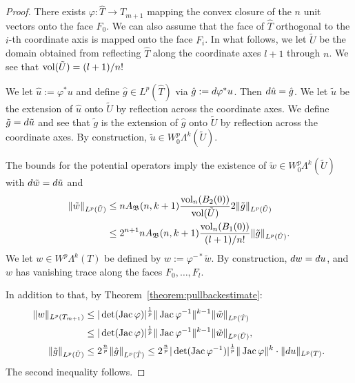 \documentclass[10pt,letterpaper]{article}
\begin{document}
\begin{proof}
    There exists $\varphi : \hat T \rightarrow T_{m+1}$ mapping the convex closure of the $n$ unit vectors onto the face $F_0$.
    We can also assume that the face of $\hat T$
    orthogonal to the $i$-th coordinate axis is mapped 
    onto the face $F_i$. 
    In what follows, we let $\tilde U$ be the domain obtained from reflecting $\hat T$ along the coordinate axes $l+1$ through $n$. 
    We see that $\operatorname{vol}(\tilde U) = (l+1)/n!$
    
    
    We let $\hat u := \varphi^{\ast} u$ and define $\hat g \in L^{p}(\hat T)$ via $\hat g := d \varphi^{\ast} u$. 
    Then $d \hat u = \hat g$. 
    We let $\tilde u$ be the extension of $\hat u$ onto $\tilde U$ by reflection across the coordinate axes.
    We define $\tilde g = d \tilde u$
    and see that $\tilde g$ is the extension of $\hat g$ onto $\tilde U$ by reflection across the coordinate axes. 
    By construction, $\tilde u \in W^{p}_{0}\Lambda^{k}(\tilde U)$.
    
    The bounds for the potential operators imply 
    the existence of $\tilde w \in W^{p}_{0}\Lambda^{k}(\tilde U)$
    with $d \tilde w = d \tilde u$ and 
    \begin{align*}
        \| \tilde w \|_{L^{p}(\tilde U)}
        &\leq 
        n A_{{\mathfrak B}}(n,k+1) \frac{ \operatorname{vol}_{n}(B_2(0)) }{ \operatorname{vol}(\tilde U) } 
        2
        \| \tilde g \|_{L^{p}(\tilde U)}
        \\&\leq 
        2^{n+1} n A_{{\mathfrak B}}(n,k+1) \frac{ \operatorname{vol}_{n}(B_1(0)) }{ (l+1)/n! } 
        \| \tilde g \|_{L^{p}(\tilde U)}
        .
    \end{align*}
    We let $w \in W^{p}\Lambda^{k}(T)$ be defined by $w := \varphi^{-\ast} \tilde w$.
    By construction, $d w = d u$,
    and $w$ has vanishing trace along the faces $F_{0},\dots,F_{l}$.
    
    In addition to that, by Theorem~\ref{theorem:pullbackestimate}:
    \begin{align*}
        \| w \|_{L^{p}(T_{m+1})}
        &\leq 
        |\det(\operatorname{{\rm Jac}} \varphi)|^{\frac 1 p} 
        \| \operatorname{{\rm Jac}} \varphi^{-1} \|^{k-1}
        \| \tilde w \|_{L^{p}(\hat T)}
        \\&
        \leq 
        |\det(\operatorname{{\rm Jac}} \varphi)|^{\frac 1 p} 
        \| \operatorname{{\rm Jac}} \varphi^{-1} \|^{k-1}
        \| \tilde w \|_{L^{p}(\tilde U)}
        ,
        \\
        \| \tilde g \|_{L^{p}(\tilde U)}
        &\leq 
        2^{\frac n p}
        \| \hat g \|_{L^{p}(\hat T)}
        \leq 
        2^{\frac n p}
        |\det( \operatorname{{\rm Jac}} \varphi^{-1} )|^{\frac 1 p} 
        \| \operatorname{{\rm Jac}} \varphi \|^{k}
        \cdot 
        \| d u \|_{L^{p}(T)}
        .
    \end{align*}
    The second inequality follows.
\end{proof}
\end{document}
